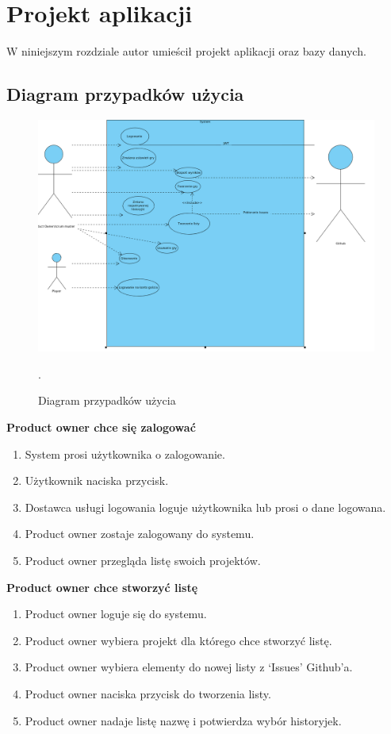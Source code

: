 ﻿\chapter{Projekt aplikacji}
W niniejszym rozdziale autor umieścił projekt aplikacji oraz bazy danych.
\section{Diagram przypadków użycia}
\begin{figure}[H]
	\centering\includegraphics[width=\textwidth]{img/UseCase.png}
	\caption{Diagram przypadków użycia}.\label{rys:useCase}
\end{figure}
\textbf{Product owner chce się zalogować}
\begin{enumerate}
    \item System prosi użytkownika o zalogowanie.
    \item Użytkownik naciska przycisk.
    \item Dostawca usługi logowania loguje użytkownika lub prosi o dane logowana.
    \item Product owner zostaje zalogowany do systemu.
    \item Product owner przegląda listę swoich projektów.
\end{enumerate}
\textbf{Product owner chce stworzyć listę}
\begin{enumerate}
    \item Product owner loguje się do systemu.
    \item Product owner wybiera projekt dla którego chce stworzyć listę.
    \item Product owner wybiera elementy do nowej listy z `Issues' Github'a.
    \item Product owner naciska przycisk do tworzenia listy.
    \item Product owner nadaje listę nazwę i potwierdza wybór historyjek.
\end{enumerate}
